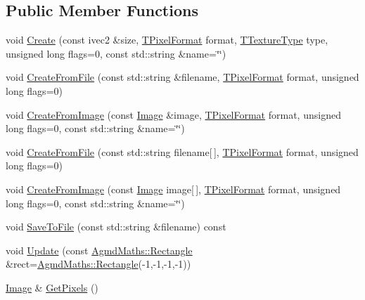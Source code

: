 \subsection*{Public Member Functions}
\begin{DoxyCompactItemize}
\item 
void \hyperlink{class_agmd_1_1_texture_ab51a802868f0cf987aa1e1f8a1422357}{Create} (const ivec2 \&size, \hyperlink{namespace_agmd_afc48fd9fa5dccb4c5621c052bfd1a7ec}{T\+Pixel\+Format} format, \hyperlink{namespace_agmd_a7036bece09449a930cfec410f75e85f4}{T\+Texture\+Type} type, unsigned long flags=0, const std\+::string \&name=\char`\"{}\char`\"{})
\item 
void \hyperlink{class_agmd_1_1_texture_abeb5dabf5ef59f83c4c4adb8ef091d96}{Create\+From\+File} (const std\+::string \&filename, \hyperlink{namespace_agmd_afc48fd9fa5dccb4c5621c052bfd1a7ec}{T\+Pixel\+Format} format, unsigned long flags=0)
\item 
void \hyperlink{class_agmd_1_1_texture_a3e117c4750da5def2f6877da8c266239}{Create\+From\+Image} (const \hyperlink{class_agmd_1_1_image}{Image} \&image, \hyperlink{namespace_agmd_afc48fd9fa5dccb4c5621c052bfd1a7ec}{T\+Pixel\+Format} format, unsigned long flags=0, const std\+::string \&name=\char`\"{}\char`\"{})
\item 
void \hyperlink{class_agmd_1_1_texture_a96d9f45d9e6b95b265d68fb7d5d9f078}{Create\+From\+File} (const std\+::string filename\mbox{[}$\,$\mbox{]}, \hyperlink{namespace_agmd_afc48fd9fa5dccb4c5621c052bfd1a7ec}{T\+Pixel\+Format} format, unsigned long flags=0)
\item 
void \hyperlink{class_agmd_1_1_texture_a3ea020baa0eddfff7cd732bb4c1042c2}{Create\+From\+Image} (const \hyperlink{class_agmd_1_1_image}{Image} image\mbox{[}$\,$\mbox{]}, \hyperlink{namespace_agmd_afc48fd9fa5dccb4c5621c052bfd1a7ec}{T\+Pixel\+Format} format, unsigned long flags=0, const std\+::string \&name=\char`\"{}\char`\"{})
\item 
void \hyperlink{class_agmd_1_1_texture_a686211a47844dbfcb765f26c09d4c562}{Save\+To\+File} (const std\+::string \&filename) const 
\item 
void \hyperlink{class_agmd_1_1_texture_a9631a110c75015db8705f1bb0378723d}{Update} (const \hyperlink{class_agmd_maths_1_1_rectangle}{Agmd\+Maths\+::\+Rectangle} \&rect=\hyperlink{class_agmd_maths_1_1_rectangle}{Agmd\+Maths\+::\+Rectangle}(-\/1,-\/1,-\/1,-\/1))
\item 
\hyperlink{class_agmd_1_1_image}{Image} \& \hyperlink{class_agmd_1_1_texture_a42ba02b636c409d71aa6888b13adc677}{Get\+Pixels} ()

\end{DoxyCompactItemize}
